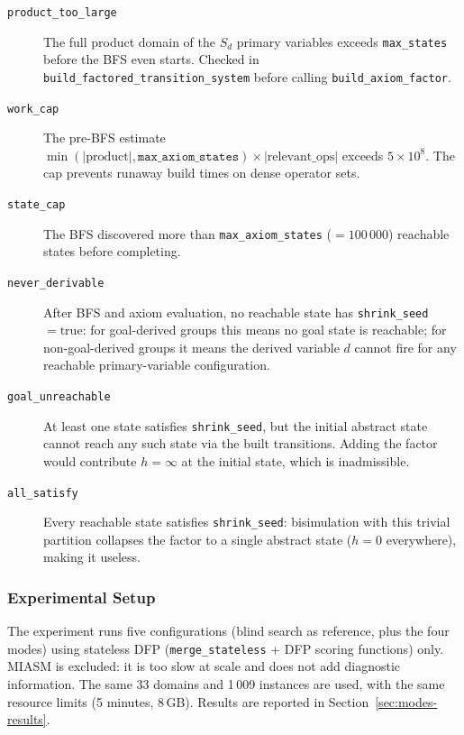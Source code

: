 \documentclass[11pt,a4paper]{article}
\begin{document}
\begin{description}
  \item[\texttt{product\_too\_large}]
    The full product domain of the $S_d$ primary variables exceeds
    \texttt{max\_states} before the BFS even starts.  Checked in
    \texttt{build\_factored\_transition\_system} before calling
    \texttt{build\_axiom\_factor}.

  \item[\texttt{work\_cap}]
    The pre-BFS estimate $\min(\lvert\text{product}\rvert,
    \texttt{max\_axiom\_states}) \times \lvert\text{relevant\_ops}\rvert$
    exceeds $5 \times 10^8$.  The cap prevents runaway build times on
    dense operator sets.

  \item[\texttt{state\_cap}]
    The BFS discovered more than \texttt{max\_axiom\_states} ($= 100\,000$)
    reachable states before completing.

  \item[\texttt{never\_derivable}]
    After BFS and axiom evaluation, no reachable state has
    \texttt{shrink\_seed} $= \mathrm{true}$: for goal-derived groups this
    means no goal state is reachable; for non-goal-derived groups it means
    the derived variable $d$ cannot fire for any reachable primary-variable
    configuration.

  \item[\texttt{goal\_unreachable}]
    At least one state satisfies \texttt{shrink\_seed}, but the initial
    abstract state cannot reach any such state via the built transitions.
    Adding the factor would contribute $h = \infty$ at the initial state,
    which is inadmissible.

  \item[\texttt{all\_satisfy}]
    Every reachable state satisfies \texttt{shrink\_seed}: bisimulation
    with this trivial partition collapses the factor to a single abstract
    state ($h = 0$ everywhere), making it useless.
\end{description}

\subsubsection{Experimental Setup}

The experiment runs five configurations (blind search as reference, plus the
four modes) using stateless DFP (\texttt{merge\_stateless} + DFP scoring
functions) only.  MIASM is excluded: it is too slow at scale and does not add
diagnostic information.  The same 33 domains and 1\,009 instances are used,
with the same resource limits (5 minutes, 8\,GB).
Results are reported in Section~\ref{sec:modes-results}.
\end{document}
